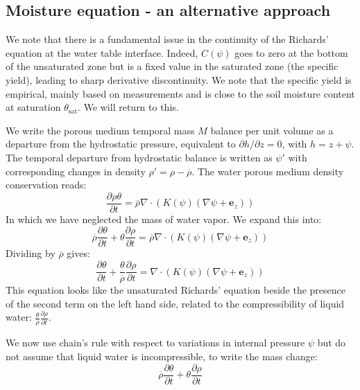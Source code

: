 \documentclass{report}
\begin{document}
\subsection{Moisture equation - an alternative approach}

We note that there is a fundamental issue in the continuity of the Richards' equation at the water table interface. Indeed, $C(\psi)$ goes to zero at the bottom of the unsaturated zone but is a fixed value in the saturated zone (the specific yield), leading to sharp derivative discontinuity. We note that the specific yield is empirical, mainly based on measurements and is close to the soil moisture content at saturation $\theta_{\mathrm{sat}}$. We will return to this.

We write the porous medium temporal mass $M$ balance per unit volume as a departure from the hydrostatic pressure, equivalent to $\partial h/\partial z=0$, with $h=z+\psi$. The temporal departure from hydrostatic balance is written as $\psi'$ with corresponding changes in density $\rho'=\rho-\overline\rho$. The water porous medium density conservation reads:
\begin{equation}
\frac{\partial \rho \theta}{\partial t} = {\overline{\rho}} \nabla \cdot \left( K(\psi) \left( \nabla \psi + {\mathbf e_z} \right) \right)
\end{equation}
In which we have neglected the mass of water vapor.
We expand this into:
\begin{equation}
{\overline \rho} \frac{\partial \theta}{\partial t} + \theta \frac{\partial \rho}{\partial t} = {\overline \rho} \nabla \cdot \left( K(\psi) \left( \nabla \psi + {\mathbf e_z} \right) \right)
\end{equation}
Dividing by $\overline \rho$ gives:
\begin{equation}
\frac{\partial \theta}{\partial t} + \frac{\theta}{\overline \rho} \frac{\partial \rho}{\partial t} = \nabla \cdot \left( K(\psi) \left( \nabla \psi + {\mathbf e_z} \right) \right)
\end{equation}
This equation looks like the unsaturated Richards’ equation beside the presence of the second term on the left hand side, related to the compressibility of liquid water: $ \frac{\theta}{\overline \rho} \frac{\partial \rho}{\partial t}$.

We now use chain’s rule with respect to variations in internal pressure $\psi$ but do not assume that liquid water is incompressible, to write the mass change:
\begin{equation}
{\overline \rho} \frac{\partial \theta}{\partial t} + \theta \frac{\partial \rho}{\partial t} 
\end{equation}
\end{document}
